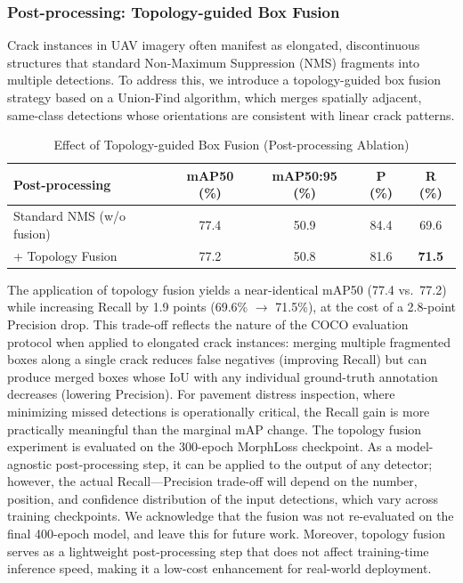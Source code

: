 \documentclass{ieeeaccess}
\begin{document}
\subsubsection{Post-processing: Topology-guided Box Fusion}

Crack instances in UAV imagery often manifest as elongated, discontinuous structures that standard Non-Maximum Suppression (NMS) fragments into multiple detections. To address this, we introduce a topology-guided box fusion strategy based on a Union-Find algorithm, which merges spatially adjacent, same-class detections whose orientations are consistent with linear crack patterns.

\begin{table}[!t]
\caption{Effect of Topology-guided Box Fusion (Post-processing Ablation)}
\label{tab:topology}
\centering
\setlength{\tabcolsep}{6pt}
\begin{tabular}{lcccc}
\toprule
Post-processing & mAP50 (\%) & mAP50:95 (\%) & P (\%) & R (\%) \\
\midrule
Standard NMS (w/o fusion) & 77.4 & 50.9 & 84.4 & 69.6 \\
+ Topology Fusion & 77.2 & 50.8 & 81.6 & \textbf{71.5} \\
\bottomrule
\end{tabular}
\end{table}

The application of topology fusion yields a near-identical mAP50 (77.4 vs.\ 77.2) while increasing Recall by 1.9 points (69.6\% $\rightarrow$ 71.5\%), at the cost of a 2.8-point Precision drop. This trade-off reflects the nature of the COCO evaluation protocol when applied to elongated crack instances: merging multiple fragmented boxes along a single crack reduces false negatives (improving Recall) but can produce merged boxes whose IoU with any individual ground-truth annotation decreases (lowering Precision). For pavement distress inspection, where minimizing missed detections is operationally critical, the Recall gain is more practically meaningful than the marginal mAP change. The topology fusion experiment is evaluated on the 300-epoch MorphLoss checkpoint. As a model-agnostic post-processing step, it can be applied to the output of any detector; however, the actual Recall---Precision trade-off will depend on the number, position, and confidence distribution of the input detections, which vary across training checkpoints. We acknowledge that the fusion was not re-evaluated on the final 400-epoch model, and leave this for future work. Moreover, topology fusion serves as a lightweight post-processing step that does not affect training-time inference speed, making it a low-cost enhancement for real-world deployment.
\end{document}
